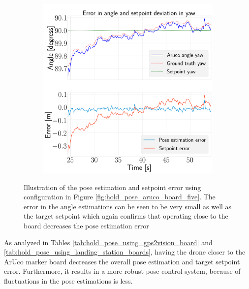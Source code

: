 \documentclass[../Head/report.tex]{subfiles}
\begin{document}
\begin{figure}[H]
\begin{subfigure}[t]{.30\textwidth}
        \caption{}
        \label{fig:hold_pose_estimation_test5_pitch}
    \end{subfigure}
     \hspace{0.2em}
    \begin{subfigure}[t]{.30\textwidth}
        \centering
        \includegraphics[width=\textwidth]{../Figures/hold_pose_using_aruco_pose_estimation/test5_landingBoard3_noWind/error_yaw/pose_error_yaw_test1.png}
        \caption{}
        \label{fig:hold_pose_estimation_test5_yaw}
    \end{subfigure}
    \caption{Illustration of the pose estimation and setpoint error using configuration in Figure \ref{fig:hold_pose_aruco_board_five}. The error in the angle estimations can be seen to be very small as well as the target setpoint which again confirms that operating close to the board decreases the pose estimation error}
    \label{fig:hold_pose_estimation_test5_error_angle}
\end{figure}

As analyzed in Tables \ref{tab:hold_pose_using_gps2vision_board} and \ref{tab:hold_pose_using_landing_station_boards}, having the drone closer to the ArUco marker board decreases the overall pose estimation and target setpoint error. Furthermore, it results in a more robust pose control system, because of fluctuations in the pose estimations is less. 
\end{document}
